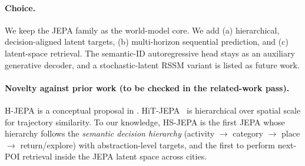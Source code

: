 \documentclass[10.5pt]{article}
\begin{document}
\paragraph{Choice.} We keep the JEPA family as the world-model core. We add (a) hierarchical, decision-aligned latent
targets, (b) multi-horizon sequential prediction, and (c) latent-space retrieval. The semantic-ID autoregressive head
stays as an auxiliary generative decoder, and a stochastic-latent RSSM variant is listed as future work.

\paragraph{Novelty against prior work (to be checked in the related-work pass).} H-JEPA is a conceptual proposal in
\cite{lecun2022path}. HiT-JEPA~\cite{hitjepa} is hierarchical over spatial scale for trajectory similarity. To our
knowledge, HS-JEPA is the first JEPA whose hierarchy follows the \emph{semantic decision hierarchy}
(activity $\rightarrow$ category $\rightarrow$ place $\rightarrow$ return/explore) with abstraction-level targets, and
the first to perform next-POI retrieval inside the JEPA latent space across cities.
\end{document}
